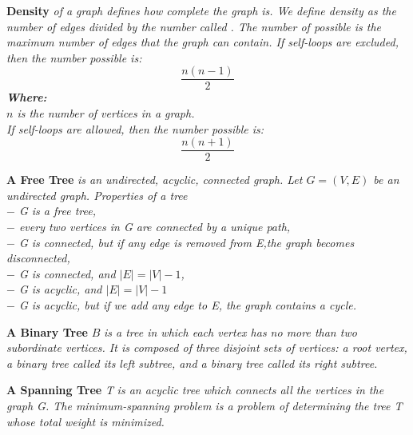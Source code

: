 	\newpage
	\begin{definition} \textbf{Density} \emph{of a graph defines how complete the graph is. We define density as the number of edges divided by the number called . The number of possible is the maximum number of edges that the graph can contain.
	If self-loops are excluded, then the number possible is:\\
	\begin{equation}\label{acyclic_density}
	\frac{n(n-1)}{2}
	\end{equation}
	\textbf{Where:}\\
	$n$ is the number of vertices in a graph.\\
	\newline
	If self-loops are allowed, then the number possible is:
	\begin{equation}\label{cyclic_density}
	\frac{n(n+1)}{2}
	\end{equation}
	}
	\newline
	\end{definition}
\begin{definition}\textbf{A Free Tree} \emph{ is an undirected, acyclic, connected graph. Let $G = (V,E)$ be an undirected graph. Properties of a tree \cite{Needham}\\
	$-$ \textit{G} is a free tree,\\
	$-$ every two vertices in \textit{G} are connected by a unique path,\\
	$-$ \textit{G} is connected, but if any edge is removed from \textit{E},the graph becomes disconnected,\\
	$-$ \textit{G} is connected, and $|E| = |V| - 1$,\\
	$-$ \textit{G} is acyclic, and $|E| = |V| - 1$\\
	$-$ \textit{G} is acyclic, but if we add any edge to \textit{E}, the graph contains a cycle.\\
}
\end{definition}
\begin{definition}\textbf{A Binary Tree} $B$ \emph{is a tree in which each vertex has no more than two subordinate vertices. It is composed of three disjoint sets of vertices: a root vertex, a binary tree called its left subtree, and a binary tree called its right subtree.\cite{La Rocca}}\end{definition}
\begin{definition}\textbf{A Spanning Tree }\textit{T} \emph{is an acyclic tree which connects all the vertices in the graph \textit{G}. The minimum-spanning problem is a problem of determining the tree \textit{T} whose total weight is minimized.\cite{Jarai}}\end{definition}
